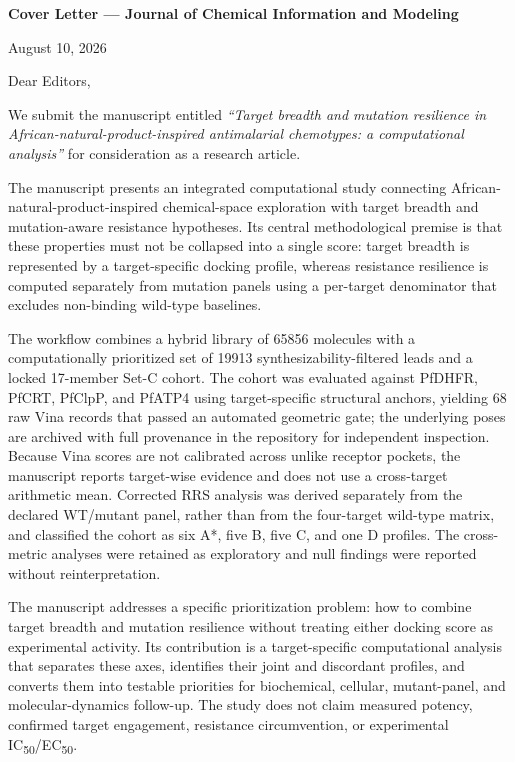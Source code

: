 \documentclass[11pt]{article}
\begin{document}
\noindent\textbf{Cover Letter — Journal of Chemical Information and Modeling}

\vspace{1em}
\noindent August 10, 2026

\vspace{1em}
Dear Editors,

We submit the manuscript entitled \textit{“Target breadth and mutation resilience in African-natural-product-inspired antimalarial chemotypes: a computational analysis”} for consideration as a research article.

The manuscript presents an integrated computational study connecting African-natural-product-inspired chemical-space exploration with target breadth and mutation-aware resistance hypotheses. Its central methodological premise is that these properties must not be collapsed into a single score: target breadth is represented by a target-specific docking profile, whereas resistance resilience is computed separately from mutation panels using a per-target denominator that excludes non-binding wild-type baselines.

The workflow combines a hybrid library of \num{65856} molecules with a computationally prioritized set of \num{19913} synthesizability-filtered leads and a locked \num{17}-member Set-C cohort. The cohort was evaluated against PfDHFR, PfCRT, PfClpP, and PfATP4 using target-specific structural anchors, yielding \num{68} raw Vina records that passed an automated geometric gate; the underlying poses are archived with full provenance in the repository for independent inspection. Because Vina scores are not calibrated across unlike receptor pockets, the manuscript reports target-wise evidence and does not use a cross-target arithmetic mean. Corrected RRS analysis was derived separately from the declared WT/mutant panel, rather than from the four-target wild-type matrix, and classified the cohort as six A*, five B, five C, and one D profiles. The cross-metric analyses were retained as exploratory and null findings were reported without reinterpretation.

The manuscript addresses a specific prioritization problem: how to combine target breadth and mutation resilience without treating either docking score as experimental activity. Its contribution is a target-specific computational analysis that separates these axes, identifies their joint and discordant profiles, and converts them into testable priorities for biochemical, cellular, mutant-panel, and molecular-dynamics follow-up. The study does not claim measured potency, confirmed target engagement, resistance circumvention, or experimental IC\textsubscript{50}/EC\textsubscript{50}.
\end{document}
